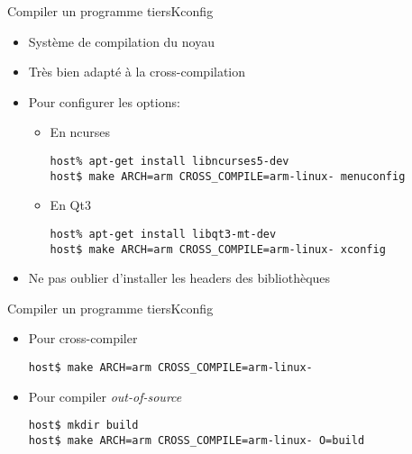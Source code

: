 \begin{frame}[fragile=singleslide]{Compiler un programme tiers}{Kconfig}
  \begin{itemize}
  \item Système de compilation du noyau
  \item Très bien adapté à la cross-compilation
  \item Pour configurer les options:
    \begin{itemize}    
    \item En ncurses
\begin{lstlisting}
host% apt-get install libncurses5-dev
host$ make ARCH=arm CROSS_COMPILE=arm-linux- menuconfig
\end{lstlisting} %
    \item En Qt3
\begin{lstlisting}
host% apt-get install libqt3-mt-dev
host$ make ARCH=arm CROSS_COMPILE=arm-linux- xconfig
\end{lstlisting} %
    \end{itemize}
  \item Ne pas oublier d'installer les headers des bibliothèques
  \end{itemize}
\end{frame}

\begin{frame}[fragile=singleslide]{Compiler un programme tiers}{Kconfig}
  \begin{itemize}
  \item Pour cross-compiler
\begin{lstlisting}
host$ make ARCH=arm CROSS_COMPILE=arm-linux-
\end{lstlisting} %
  \item Pour compiler \emph{out-of-source}
\begin{lstlisting}
host$ mkdir build
host$ make ARCH=arm CROSS_COMPILE=arm-linux- O=build
\end{lstlisting} %
  \end{itemize}
\end{frame}

